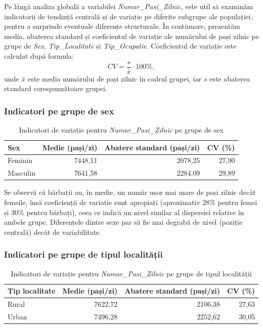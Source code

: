 \documentclass[12pt,a4paper]{report}
\begin{document}
Pe lângă analiza globală a variabilei \textit{Numar\_Pasi\_Zilnic}, este util să examinăm indicatorii de tendință centrală și de variație pe diferite subgrupe ale populației, pentru a surprinde eventuale diferențe structurale. În continuare, prezentăm media, abaterea standard și coeficientul de variație ale numărului de pași zilnic pe grupe de \textit{Sex}, \textit{Tip\_Localitate} și \textit{Tip\_Ocupatie}. Coeficientul de variație este calculat după formula:
$$
CV = \frac{s}{\bar{x}} \cdot 100\%,
$$
unde \(\bar{x}\) este media numărului de pași zilnic în cadrul grupei, iar \(s\) este abaterea standard corespunzătoare grupei.

\subsubsection*{Indicatori pe grupe de sex}

\begin{table}[h!]
    \centering
    \caption{Indicatori de variație pentru \textit{Numar\_Pasi\_Zilnic} pe grupe de sex}
    \label{tab:ind-grupe-sex}
    \begin{tabular}{l r r r}
        \hline
        \textbf{Sex} & \textbf{Medie (pași/zi)} & \textbf{Abatere standard (pași/zi)} & \textbf{CV (\%)} \\
        \hline
        Feminin  & 7448{,}11 & 2078{,}25 & 27{,}90 \\
        Masculin & 7641{,}58 & 2284{,}09 & 29{,}89 \\
        \hline
    \end{tabular}
\end{table}

Se observă că bărbații au, în medie, un număr ușor mai mare de pași zilnic decât femeile, însă coeficienții de variație sunt apropiați (aproximativ \(28\%\) pentru femei și \(30\%\) pentru bărbați), ceea ce indică un nivel similar al dispersiei relative în ambele grupe. Diferențele dintre sexe par să fie mai degrabă de nivel (poziție centrală) decât de variabilitate.

\subsubsection*{Indicatori pe grupe de tipul localității}

\begin{table}[h!]
    \centering
    \caption{Indicatori de variație pentru \textit{Numar\_Pasi\_Zilnic} pe grupe de tipul localității}
    \label{tab:ind-grupe-localitate}
    \begin{tabular}{l r r r}
        \hline
        \textbf{Tip localitate} & \textbf{Medie (pași/zi)} & \textbf{Abatere standard (pași/zi)} & \textbf{CV (\%)} \\
        \hline
        Rural & 7622{,}72 & 2106{,}38 & 27{,}63 \\
        Urban & 7496{,}28 & 2252{,}62 & 30{,}05 \\
        \hline
    \end{tabular}
\end{table}
\end{document}
